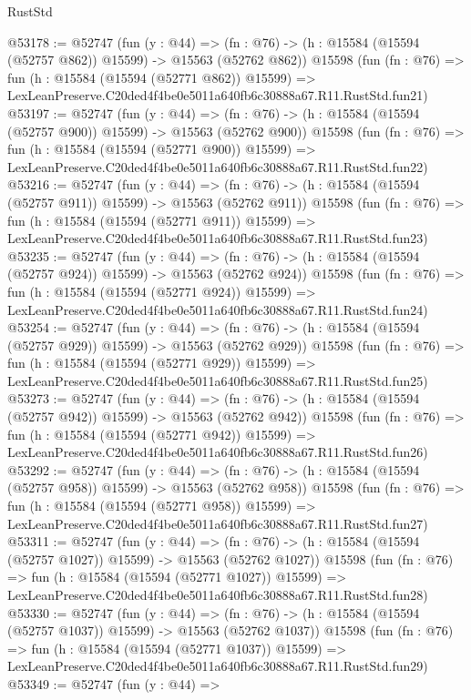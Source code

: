\begin{lexlean}{RustStd}
\begin{coremodule}
@53178 := @52747
    (fun (y : @44) =>
    (fn : @76) -> (h : @15584 (@15594 (@52757 @862)) @15599) -> @15563 (@52762 @862))
    @15598
    (fun (fn : @76) =>
    fun (h : @15584 (@15594 (@52771 @862)) @15599) =>
    LexLeanPreserve.C20ded4f4be0e5011a640fb6c30888a67.R11.RustStd.fun21)
@53197 := @52747
    (fun (y : @44) =>
    (fn : @76) -> (h : @15584 (@15594 (@52757 @900)) @15599) -> @15563 (@52762 @900))
    @15598
    (fun (fn : @76) =>
    fun (h : @15584 (@15594 (@52771 @900)) @15599) =>
    LexLeanPreserve.C20ded4f4be0e5011a640fb6c30888a67.R11.RustStd.fun22)
@53216 := @52747
    (fun (y : @44) =>
    (fn : @76) -> (h : @15584 (@15594 (@52757 @911)) @15599) -> @15563 (@52762 @911))
    @15598
    (fun (fn : @76) =>
    fun (h : @15584 (@15594 (@52771 @911)) @15599) =>
    LexLeanPreserve.C20ded4f4be0e5011a640fb6c30888a67.R11.RustStd.fun23)
@53235 := @52747
    (fun (y : @44) =>
    (fn : @76) -> (h : @15584 (@15594 (@52757 @924)) @15599) -> @15563 (@52762 @924))
    @15598
    (fun (fn : @76) =>
    fun (h : @15584 (@15594 (@52771 @924)) @15599) =>
    LexLeanPreserve.C20ded4f4be0e5011a640fb6c30888a67.R11.RustStd.fun24)
@53254 := @52747
    (fun (y : @44) =>
    (fn : @76) -> (h : @15584 (@15594 (@52757 @929)) @15599) -> @15563 (@52762 @929))
    @15598
    (fun (fn : @76) =>
    fun (h : @15584 (@15594 (@52771 @929)) @15599) =>
    LexLeanPreserve.C20ded4f4be0e5011a640fb6c30888a67.R11.RustStd.fun25)
@53273 := @52747
    (fun (y : @44) =>
    (fn : @76) -> (h : @15584 (@15594 (@52757 @942)) @15599) -> @15563 (@52762 @942))
    @15598
    (fun (fn : @76) =>
    fun (h : @15584 (@15594 (@52771 @942)) @15599) =>
    LexLeanPreserve.C20ded4f4be0e5011a640fb6c30888a67.R11.RustStd.fun26)
@53292 := @52747
    (fun (y : @44) =>
    (fn : @76) -> (h : @15584 (@15594 (@52757 @958)) @15599) -> @15563 (@52762 @958))
    @15598
    (fun (fn : @76) =>
    fun (h : @15584 (@15594 (@52771 @958)) @15599) =>
    LexLeanPreserve.C20ded4f4be0e5011a640fb6c30888a67.R11.RustStd.fun27)
@53311 := @52747
    (fun (y : @44) =>
    (fn : @76) -> (h : @15584 (@15594 (@52757 @1027)) @15599) -> @15563 (@52762 @1027))
    @15598
    (fun (fn : @76) =>
    fun (h : @15584 (@15594 (@52771 @1027)) @15599) =>
    LexLeanPreserve.C20ded4f4be0e5011a640fb6c30888a67.R11.RustStd.fun28)
@53330 := @52747
    (fun (y : @44) =>
    (fn : @76) -> (h : @15584 (@15594 (@52757 @1037)) @15599) -> @15563 (@52762 @1037))
    @15598
    (fun (fn : @76) =>
    fun (h : @15584 (@15594 (@52771 @1037)) @15599) =>
    LexLeanPreserve.C20ded4f4be0e5011a640fb6c30888a67.R11.RustStd.fun29)
@53349 := @52747
    (fun (y : @44) =>

\end{coremodule}
\end{lexlean}
